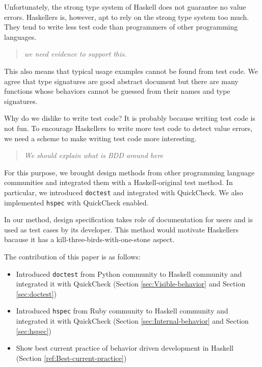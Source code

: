 \documentclass[preprint]{sigplanconf}
\begin{document}
Unfortunately, the strong type system of Haskell does not guarantee
no value errors.
Haskellers is, however, apt to rely on the strong type system too much.
They tend to write less test code than programmers of other
programming languages. 

\begin{quote}
    \emph{we need evidence to support this.}
\end{quote}

This also means that typical usage examples cannot be found from test code.
We agree that type signatures are good abstract document but
there are many functions whose behaviors cannot be guessed from
their names and type signatures.

Why do we dislike to write test code?
It is probably because writing test code is not fun.
To encourage Haskellers to write more test code
to detect value errors,
we need a scheme to make writing test code more interesting.

\begin{quote}
    \emph{We should explain what is BDD around here}
\end{quote}

For this purpose,
we brought design methods from other programming language communities and
integrated them with a Haskell-original test method.
In particular, we introduced {\tt doctest} and
integrated with QuickCheck. 
We also implemented {\tt hspec} with QuickCheck enabled.

In our method, design specification takes role of documentation for users and
is used as test cases by its developer. 
This method would motivate Haskellers
bacause it has a kill-three-birds-with-one-stone aspect.



The contribution of this paper is as follows:

\begin{itemize}
\item Introduced {\tt doctest} from Python community to Haskell community
and integrated it with QuickCheck
(Section \ref{sec:Visible-behavior} and Section \ref{sec:doctest})
\item Introduced {\tt hspec} from Ruby community to Haskell community and
integrated it with QuickCheck
(Section \ref{sec:Internal-behavior} and Section \ref{sec:hspec})
\item Show best current practice of behavior driven development in Haskell (Section \ref{ref:Best-current-practice})
\end{itemize}
\end{document}
